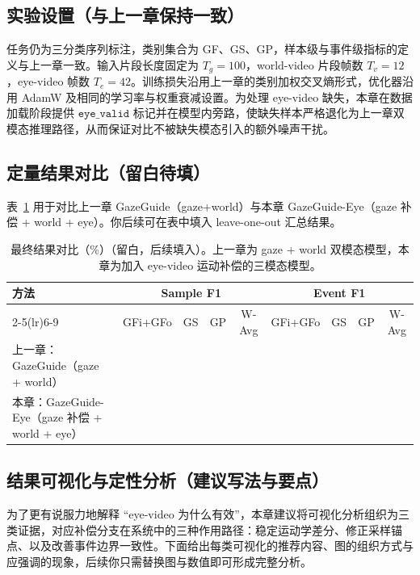 \documentclass{xdupgthesis}
\newcommand{\ModelMM}{GazeGuide}
\begin{document}
\subsection{实验设置（与上一章保持一致）}

任务仍为三分类序列标注，类别集合为 GF、GS、GP，样本级与事件级指标的定义与上一章一致。输入片段长度固定为 $T_g=100$，world-video 片段帧数 $T_v=12$，eye-video 帧数 $T_e=42$。训练损失沿用上一章的类别加权交叉熵形式，优化器沿用 AdamW 及相同的学习率与权重衰减设置。为处理 eye-video 缺失，本章在数据加载阶段提供 $\texttt{eye\_valid}$ 标记并在模型内旁路，使缺失样本严格退化为上一章双模态推理路径，从而保证对比不被缺失模态引入的额外噪声干扰。

\subsection{定量结果对比（留白待填）}

表~\ref{tab:mm_eye_final} 用于对比上一章 \ModelMM{}（gaze+world）与本章 \ModelMM{}-Eye（gaze 补偿 + world + eye）。你后续可在表中填入 leave-one-out 汇总结果。

\begin{table}[htbp]
\centering
\caption{最终结果对比（\%）（留白，后续填入）。上一章为 gaze + world 双模态模型，本章为加入 eye-video 运动补偿的三模态模型。}
\label{tab:mm_eye_final}
\renewcommand{\arraystretch}{1.15}
\setlength{\tabcolsep}{6pt}
\begin{tabular}{lcccccccc}
\toprule
\multirow{2}{*}{方法} & \multicolumn{4}{c}{Sample F1} & \multicolumn{4}{c}{Event F1} \\
\cmidrule(lr){2-5}\cmidrule(lr){6-9}
 & GFi+GFo & GS & GP & W-Avg & GFi+GFo & GS & GP & W-Avg \\
\midrule
上一章：\ModelMM{}（gaze + world） &  &  &  &  &  &  &  &  \\
本章：\ModelMM{}-Eye（gaze 补偿 + world + eye） &  &  &  &  &  &  &  &  \\
\bottomrule
\end{tabular}
\end{table}

\subsection{结果可视化与定性分析（建议写法与要点）}

为了更有说服力地解释 ``eye-video 为什么有效''，本章建议将可视化分析组织为三类证据，对应补偿分支在系统中的三种作用路径：稳定运动学差分、修正采样锚点、以及改善事件边界一致性。下面给出每类可视化的推荐内容、图的组织方式与应强调的现象，后续你只需替换图与数值即可形成完整分析。
\end{document}
